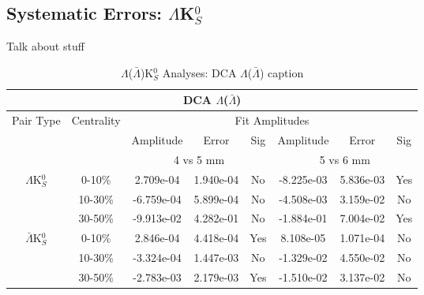 \documentclass[../AnalysisNoteJBuxton.tex]{subfiles}
\begin{document}
\subsection{Systematic Errors: \texorpdfstring{$\Lambda$K$^{0}_{S}$}{TEXT}}
\label{SysErrsLamK0}

Talk about stuff

\begin{table}
 \centering
 \begin{tabular}{|c|c|c|c|c||c|c|c|}
  \multicolumn{8}{c}{DCA $\Lambda$($\bar{\Lambda}$)} \\
  \hline
  \multirow{3}{*}{Pair Type} & \multirow{3}{*}{Centrality} & \multicolumn{6}{c|}{Fit Amplitudes} \\
  \cline{3-8}
   & & Amplitude & Error & Sig & Amplitude & Error & Sig \\
  \cline{3-8}
   & & \multicolumn{3}{c||}{4 vs 5 mm} & \multicolumn{3}{c|}{5 vs 6 mm} \\
  \hline  
  \multirow{3}{*}{$\Lambda$K$^{0}_{S}$}  
   &  0-10\% & 2.709e-04 & 1.940e-04 & No & -8.225e-03 & 5.836e-03 & Yes \\
   & 10-30\% & -6.759e-04 & 5.899e-04 & No & -4.508e-03 & 3.159e-02 & No \\
   & 30-50\% & -9.913e-02 & 4.282e-01 & No & -1.884e-01 & 7.004e-02 & Yes \\
  \hline  
  \multirow{3}{*}{$\bar{\Lambda}$K$^{0}_{S}$}  
   &  0-10\% & 2.846e-04 & 4.418e-04 & Yes & 8.108e-05 & 1.071e-04 & No \\
   & 10-30\% & -3.324e-04 & 1.447e-03 & No & -1.329e-02 & 4.550e-02 & No \\
   & 30-50\% & -2.783e-03 & 2.179e-03 & Yes & -1.510e-02 & 3.137e-02 & No \\ 
  \hline
 \end{tabular}
 \caption{$\Lambda$($\bar{\Lambda}$)K$^{0}_{S}$ Analyses: DCA $\Lambda$($\bar{\Lambda}$) caption}
 \label{tab:LamDcaLamK0}
\end{table}
\end{document}
